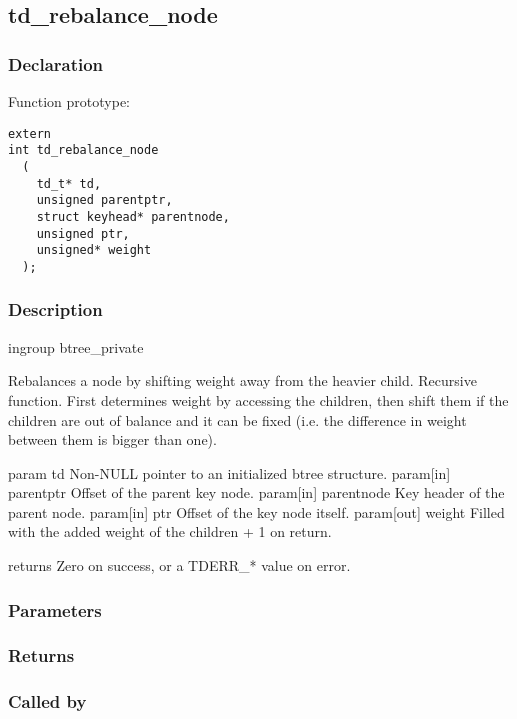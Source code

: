 
\newpage
\subsection{td\_rebalance\_node}
\subsubsection{Declaration} Function prototype:

\begin{verbatim}
extern
int td_rebalance_node
  (
    td_t* td,
    unsigned parentptr,
    struct keyhead* parentnode,
    unsigned ptr,
    unsigned* weight
  );
\end{verbatim}

\subsubsection{Description}


 ingroup btree\_private

 Rebalances a node by shifting weight away from the heavier child.
 Recursive function.
 First determines weight by accessing the children, then shift them
 if the children are out of balance and it can be fixed (i.e. the
 difference in weight between them is bigger than one).

 param td Non-NULL pointer to an initialized btree structure.
 param[in] parentptr Offset of the parent key node.
 param[in] parentnode Key header of the parent node.
 param[in] ptr Offset of the key node itself.
 param[out] weight Filled with the added weight of the children + 1
 on return.

 returns Zero on success, or a TDERR\_* value on error.
 

\subsubsection{Parameters}
\subsubsection{Returns}
\subsubsection{Called by}

